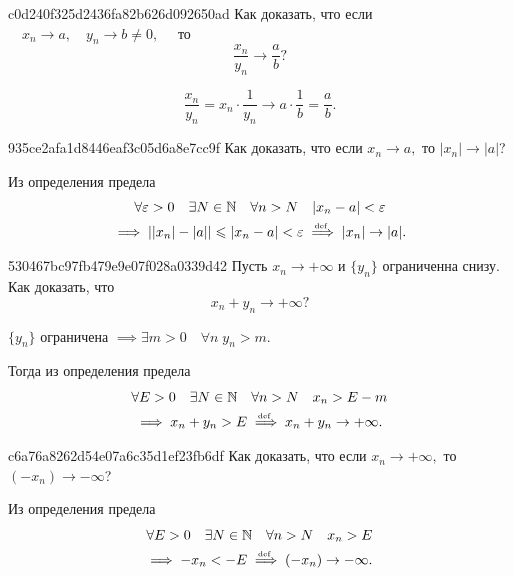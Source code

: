     \begin{note}{c0d240f325d2436fa82b626d092650ad}
        Как доказать, что если \( \quad x_n \to a, \quad y_n \to b \neq 0, \quad \) то \[
            \frac{x_n}{y_n} \to \frac{a}{b}?
        \]

        \begin{cloze}{1}
            \[
                \frac{x_n}{y_n} = x_n \cdot \frac{1}{y_n} \to a \cdot \frac{1}{b} = \frac{a}{b}.
            \]
        \end{cloze}
    \end{note}

    \begin{note}{935ce2afa1d8446eaf3c05d6a8e7cc9f}
        Как доказать, что если \( x_n \to a,  \) то \( |x_n| \to |a| \)?

        \begin{cloze}{1}
            Из определения предела
            \begin{multline*}
                \forall \varepsilon > 0 \quad \exists N \in \mathbb N \quad \forall n > N \quad |x_n - a| < \varepsilon \\
                \implies | |x_n| - |a| | \leqslant  |x_n - a| < \varepsilon \overset{\!\!\text{\tiny def}}\implies |x_n| \to |a|.
            \end{multline*}
        \end{cloze}
   \end{note}

   \begin{note}{530467bc97fb479e9e07f028a0339d42}
        Пусть \( x_n \to +\infty \) и \( \{ y_n \} \) ограниченна снизу. Как доказать, что \[ x_n + y_n \to +\infty? \]

        \begin{cloze}{1}
            \( \{ y_n \} \) ограничена \( \implies \exists m > 0 \quad \forall n \; y_n > m. \)

            Тогда из определения предела
            \begin{multline*}
                \forall E > 0 \quad \exists N \in \mathbb N \quad \forall n > N \quad x_n > E - m \\
                \implies x_n + y_n > E \overset{\!\!\text{\tiny def}}\implies x_n + y_n \to +\infty.
            \end{multline*}
        \end{cloze}
   \end{note}

    \begin{note}{c6a76a8262d54e07a6c35d1ef23fb6df}
        Как доказать, что если \( x_n \to +\infty, \) то \( (-x_n) \to -\infty \)?

        \begin{cloze}{1}
            Из определения предела
            \begin{multline*}
                \forall E > 0 \quad \exists N \in \mathbb N \quad \forall n > N \quad x_n > E \\
                \implies -x_n < -E \overset{\!\!\text{\tiny def}}\implies (-x_n) \to -\infty.
            \end{multline*}
        \end{cloze}
    \end{note}

